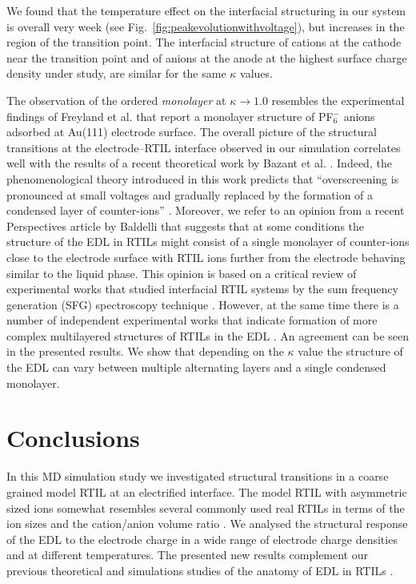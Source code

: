 \documentclass[final,5p,times,twocolumn]{elsarticle}
\begin{document}
We found that the temperature effect on the interfacial structuring in our system is overall very week (see Fig.~\ref{fig:peakevolutionwithvoltage}), but increases in the region of the transition point. The interfacial structure of cations at the cathode near the transition point and of anions at the anode at the highest surface charge density under study, are similar for the same $\kappa$ values.

The observation of the ordered \textit{monolayer} at $\kappa \rightarrow 1.0$ resembles the experimental findings of Freyland et al. \cite{Pan2006,Freyland2008} that report a monolayer structure of PF$_6^-$ anions adsorbed at Au(111) electrode surface. The overall picture of the structural transitions at the electrode--RTIL interface observed in our simulation correlates well with the results of a recent theoretical work by Bazant et al. \cite{Bazant2011}. Indeed, the phenomenological theory introduced in this work predicts that ``overscreening is pronounced at small voltages and gradually replaced by the formation of a condensed layer of counter-ions'' \cite{Bazant2011}. Moreover, we refer to an opinion from a recent Perspectives article by Baldelli \cite{Baldelli2013} that suggests that at some conditions the structure of the EDL in RTILs might consist of a single monolayer of counter-ions close to the electrode surface with RTIL ions further from the electrode behaving similar to the liquid phase. This opinion is based on a critical review of experimental works that studied interfacial RTIL systems by the sum frequency generation (SFG) spectroscopy technique \cite{Martinez2010,Baldelli2011,Penalber2012}. However, at the same time there is a number of independent experimental works that indicate formation of more complex multilayered structures of RTILs in the EDL \cite{Hayes2011,Zhou2012,Lauw2012,Tamam2011,Tamura2011,Cremer2011,Carstens2012,Borisenko2012,Atkin2009,Perkin2012}. An agreement can be seen in the presented results. We show that depending on the $\kappa$ value the structure of the EDL can vary between multiple alternating layers and a single condensed monolayer.

\section{Conclusions}

In this MD simulation study we investigated structural transitions in a coarse grained model RTIL at an electrified interface. The model RTIL with asymmetric sized ions \cite{Fedorov2008a} somewhat resembles several commonly used real RTILs in terms of the ion sizes and the cation/anion volume ratio \cite{Costa2012}. We analysed the structural response of the EDL to the electrode charge in a wide range of electrode charge densities and at different temperatures. The presented new results complement our previous theoretical and simulations studies of the anatomy of EDL in RTILs \cite{Fedorov2008,Fedorov2008a,Fedorov2010,Georgi2010,Lynden-Bell2012}. 
\end{document}
